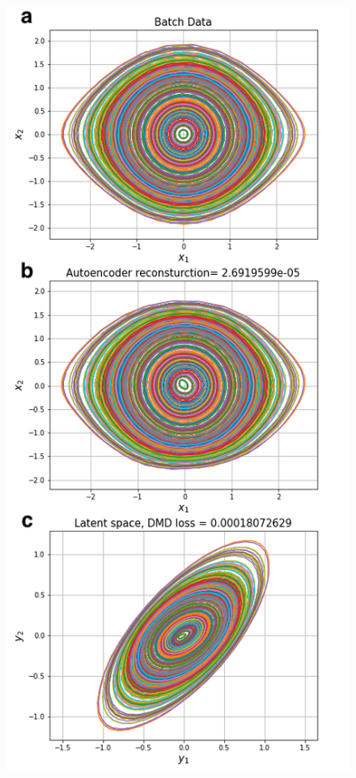 \documentclass[twocolumn, letterpaper]{scrartcl}
\begin{document}
    \begin{figure}[H]
        \centering
        \vspace{-\intextsep}
        \includegraphics[width=\linewidth]{figure3.PNG}

\end{figure}
\end{document}
